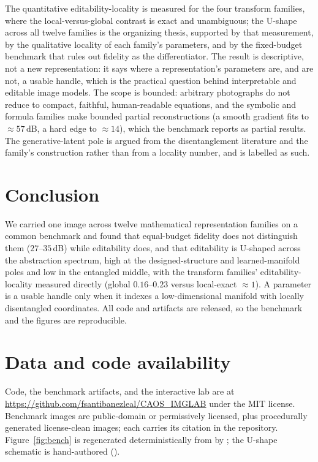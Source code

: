 \documentclass[journal]{IEEEtran}
\begin{document}
The quantitative editability-locality is measured for the four transform families, where the
local-versus-global contrast is exact and unambiguous; the U-shape across all twelve families is the
organizing thesis, supported by that measurement, by the qualitative locality of each family's
parameters, and by the fixed-budget benchmark that rules out fidelity as the differentiator. The
result is descriptive, not a new representation: it says where a representation's parameters are, and
are not, a usable handle, which is the practical question behind interpretable and editable image
models. The scope is bounded: arbitrary photographs do not reduce to compact, faithful,
human-readable equations, and the symbolic and formula families make bounded partial
reconstructions (a smooth gradient fits to $\approx57$\,dB, a hard edge to $\approx14$), which the
benchmark reports as partial results. The generative-latent pole is
argued from the disentanglement literature and the family's construction rather than from a locality
number, and is labelled as such.

\section{Conclusion}

We carried one image across twelve mathematical representation families on a common benchmark and
found that equal-budget fidelity does not distinguish them ($27$--$35$\,dB) while editability does,
and that editability is U-shaped across the abstraction spectrum, high at the designed-structure and
learned-manifold poles and low in the entangled middle, with the transform families' editability-locality
measured directly (global $0.16$--$0.23$ versus local-exact $\approx1$). A parameter is a usable
handle only when it indexes a low-dimensional manifold with locally disentangled coordinates. All
code and artifacts are released, so the benchmark and the figures are reproducible.

\section*{Data and code availability}

{\raggedright
Code, the benchmark artifacts, and the interactive lab are at
\url{https://github.com/fsantibanezleal/CAOS_IMGLAB} under the MIT license. Benchmark images are
public-domain or permissively licensed, plus procedurally generated license-clean images; each
carries its citation in the repository. Figure~\ref{fig:bench} is regenerated deterministically
from  by
; the U-shape schematic is
hand-authored ().\par}
\end{document}
